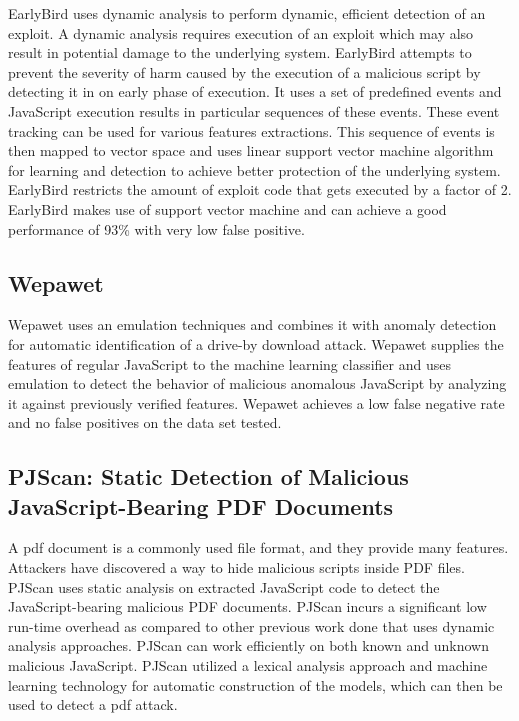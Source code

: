 EarlyBird uses dynamic analysis to perform dynamic, efficient detection of an exploit. A dynamic analysis requires execution of an exploit which may also result in potential damage to the underlying system. EarlyBird attempts to prevent the severity of harm caused by the execution of a malicious script by detecting it in on early phase of execution. It uses a set of predefined events and JavaScript execution results in particular sequences of these events. These event tracking can be used for various features extractions. This sequence of events is then mapped to vector space and uses linear support vector machine algorithm for learning and detection to achieve better protection of the underlying system. EarlyBird restricts the amount of exploit code that gets executed by a factor of 2. EarlyBird makes use of support vector machine and can achieve a good performance of 93\% with very low false positive. 

\subsection{Wepawet ~\cite{g8}} \label{wepawet }

Wepawet uses an emulation techniques and combines it with anomaly detection for automatic identification of a drive-by download attack. Wepawet supplies the features of regular JavaScript to the machine learning classifier and uses emulation to detect the behavior of malicious anomalous JavaScript by analyzing it against previously verified features. Wepawet achieves a low false negative rate and no false positives on the data set tested.

\subsection{PJScan: Static Detection of Malicious JavaScript-Bearing PDF Documents ~\cite{g4}}

A pdf document is a commonly used file format, and they provide many features. Attackers have discovered a way to hide malicious scripts inside PDF files. PJScan uses static analysis on extracted JavaScript code to detect the JavaScript-bearing malicious PDF documents. PJScan incurs a significant low run-time overhead as compared to other previous work done that uses dynamic analysis approaches. PJScan can work efficiently on both known and unknown malicious JavaScript. PJScan utilized a lexical analysis approach and machine learning technology for automatic construction of the models, which can then be used to detect a pdf attack. 

